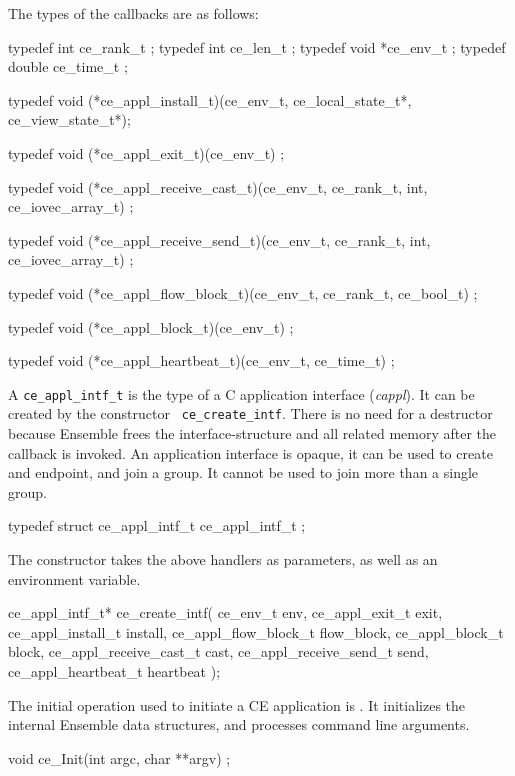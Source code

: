 The types of the callbacks are as follows:
\begin{codebox}
typedef int         ce_rank_t ;
typedef int         ce_len_t ;
typedef void       *ce_env_t ;
typedef double      ce_time_t ;

typedef void (*ce_appl_install_t)(ce_env_t, ce_local_state_t*, ce_view_state_t*);

typedef void (*ce_appl_exit_t)(ce_env_t) ;

typedef void (*ce_appl_receive_cast_t)(ce_env_t, ce_rank_t, int, ce_iovec_array_t) ;

typedef void (*ce_appl_receive_send_t)(ce_env_t, ce_rank_t, int, ce_iovec_array_t) ;

typedef void (*ce_appl_flow_block_t)(ce_env_t, ce_rank_t, ce_bool_t) ;

typedef void (*ce_appl_block_t)(ce_env_t) ;

typedef void (*ce_appl_heartbeat_t)(ce_env_t, ce_time_t) ;
\end{codebox}


A {\tt ce\_appl\_intf\_t} is the type of a C application interface
({\it cappl}).  It can be created by the constructor {\tt
ce\_create\_intf}. There is no need for a destructor because Ensemble
frees the interface-structure and all related memory after the 
callback is invoked. An application interface is opaque, it can be
used to create and endpoint, and join a group. It cannot be used to 
join more than a single group.
\begin{codebox}
typedef struct ce_appl_intf_t ce_appl_intf_t ;
\end{codebox}


The constructor takes the above handlers as parameters, as well as
an environment variable. 

\begin{codebox}
ce_appl_intf_t*
ce_create_intf(
    ce_env_t env, 
    ce_appl_exit_t exit,
    ce_appl_install_t install,
    ce_appl_flow_block_t flow_block,
    ce_appl_block_t block,
    ce_appl_receive_cast_t cast,
    ce_appl_receive_send_t send,
    ce_appl_heartbeat_t heartbeat
);
\end{codebox}

The initial operation used to initiate a CE application is
. It initializes the internal Ensemble data structures, and
processes command line arguments.

\begin{codebox}
void ce_Init(int argc, char **argv) ;
\end{codebox}


